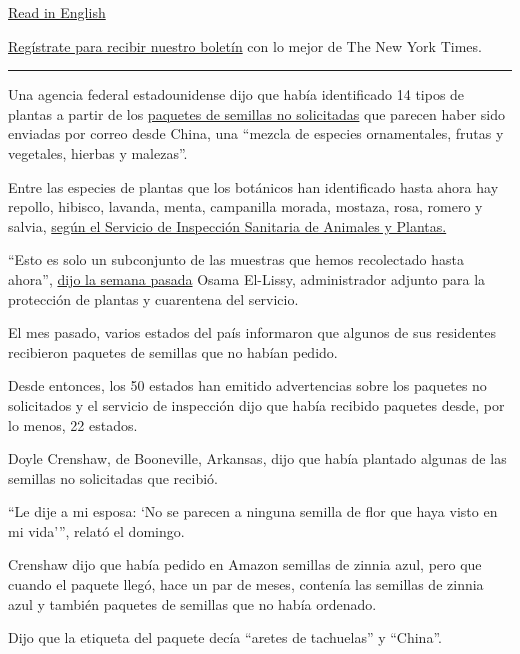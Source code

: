 \href{https://www.nytimes.com/2020/08/02/us/Seed-packets-China-USA.html}{Read
in English}

\href{https://www.nytimes.com/newsletters/el-times}{Regístrate para
recibir nuestro boletín} con lo mejor de The New York Times.

\begin{center}\rule{0.5\linewidth}{\linethickness}\end{center}

Una agencia federal estadounidense dijo que había identificado 14 tipos
de plantas a partir de los
\href{https://www.nytimes.com/2020/07/26/us/seeds-from-china-mail.html}{paquetes
de semillas no solicitadas} que parecen haber sido enviadas por correo
desde China, una ``mezcla de especies ornamentales, frutas y vegetales,
hierbas y malezas''.

Entre las especies de plantas que los botánicos han identificado hasta
ahora hay repollo, hibisco, lavanda, menta, campanilla morada, mostaza,
rosa, romero y salvia,
\href{https://www.aphis.usda.gov/publications/plant_health/faq-unsolicited-seeds.pdf}{según
el Servicio de Inspección Sanitaria de Animales y Plantas.}

``Esto es solo un subconjunto de las muestras que hemos recolectado
hasta ahora'',
\href{https://www.usda.gov/media/radio/daily-newsline/2020-07-29/actuality-unsolicited-seeds-are-several-plant-species}{dijo
la semana pasada} Osama El-Lissy, administrador adjunto para la
protección de plantas y cuarentena del servicio.

El mes pasado, varios estados del país informaron que algunos de sus
residentes recibieron paquetes de semillas que no habían pedido.

Desde entonces, los 50 estados han emitido advertencias sobre los
paquetes no solicitados y el servicio de inspección dijo que había
recibido paquetes desde, por lo menos, 22 estados.

Doyle Crenshaw, de Booneville, Arkansas, dijo que había plantado algunas
de las semillas no solicitadas que recibió.

``Le dije a mi esposa: `No se parecen a ninguna semilla de flor que haya
visto en mi vida''', relató el domingo.

Crenshaw dijo que había pedido en Amazon semillas de zinnia azul, pero
que cuando el paquete llegó, hace un par de meses, contenía las semillas
de zinnia azul y también paquetes de semillas que no había ordenado.

Dijo que la etiqueta del paquete decía ``aretes de tachuelas'' y
``China''.

